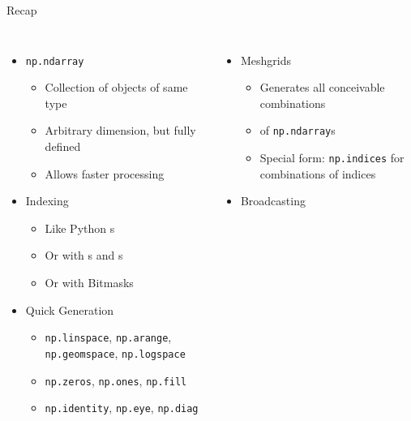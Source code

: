 
\begin{frame}[t,plain]
\titlepage
\end{frame}


\begin{frame}{Recap}
%
\begin{columns}[T]
\begin{itemize}
\item \texttt{np.ndarray}
	\begin{itemize}
	\item Collection of objects of same type
	\item Arbitrary dimension, but fully defined
	\item Allows faster processing
	\end{itemize}
\item Indexing
	\begin{itemize}
	\item Like Python s
	\item Or with s and s
	\item Or with Bitmasks
	\end{itemize}
\item Quick Generation
	\begin{itemize}
	\item \texttt{np.linspace}, \texttt{np.arange}, \texttt{np.geomspace}, \texttt{np.logspace}
	\item \texttt{np.zeros}, \texttt{np.ones}, \texttt{np.fill}
	\item \texttt{np.identity}, \texttt{np.eye}, \texttt{np.diag}
	\end{itemize}
\end{itemize}
%
\begin{itemize}
\item Meshgrids
	\begin{itemize}
	\item Generates all conceivable combinations
	\item {} of \texttt{np.ndarray}s
	\item Special form: \texttt{np.indices} for combinations of indices
	\end{itemize}
\item Broadcasting
	\begin{itemize}

\end{itemize}
\end{itemize}
\end{columns}
\end{frame}
